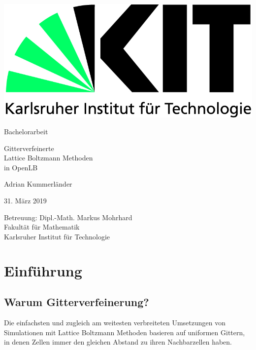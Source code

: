 \documentclass[12pt,a4paper]{scrartcl}
\numberwithin{equation}{section}
\begin{document}
\pagestyle{empty}
\begin{titlepage}

\includegraphics[scale=0.45]{img/kit-logo.jpg}
\vspace*{2cm}

\begin{center} \large
Bachelorarbeit
\vspace*{2cm}

{\huge Gitterverfeinerte \\ Lattice Boltzmann Methoden \\ in OpenLB \\}
\vspace*{2.5cm}

Adrian Kummerländer
\vspace*{1.5cm}

31. März 2019
\vspace*{3cm}

Betreuung: Dipl.-Math. Markus Mohrhard \\[1cm]
Fakultät für Mathematik \\[1cm]
Karlsruher Institut für Technologie
\end{center}

\end{titlepage}

\tableofcontents
\newpage

\pagestyle{headings}

\section{Einführung}

\subsection{Warum Gitterverfeinerung?}

Die einfachsten und zugleich am weitesten verbreiteten Umsetzungen von Simulationen mit Lattice Boltzmann Methoden basieren auf uniformen Gittern, in denen Zellen immer den gleichen Abstand zu ihren Nachbarzellen haben.
\end{document}
